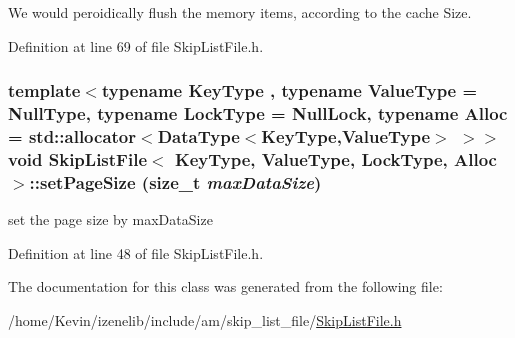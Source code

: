 We would peroidically flush the memory items, according to the cache Size. 

Definition at line 69 of file SkipListFile.h.\hypertarget{classSkipListFile_b8a6cbf9fb0386dd4eb965b2aad18f53}{
\subsubsection[{setPageSize}]{\setlength{\rightskip}{0pt plus 5cm}template$<$typename KeyType , typename ValueType  = NullType, typename LockType  = NullLock, typename Alloc  = std::allocator$<$DataType$<$KeyType,ValueType$>$ $>$$>$ void {\bf SkipListFile}$<$ KeyType, ValueType, LockType, Alloc $>$::setPageSize (size\_\-t {\em maxDataSize})}}
\label{classSkipListFile_b8a6cbf9fb0386dd4eb965b2aad18f53}


set the page size by maxDataSize 

Definition at line 48 of file SkipListFile.h.

The documentation for this class was generated from the following file:\begin{CompactItemize}
\item 
/home/Kevin/izenelib/include/am/skip\_\-list\_\-file/\hyperlink{SkipListFile_8h}{SkipListFile.h}\end{CompactItemize}
